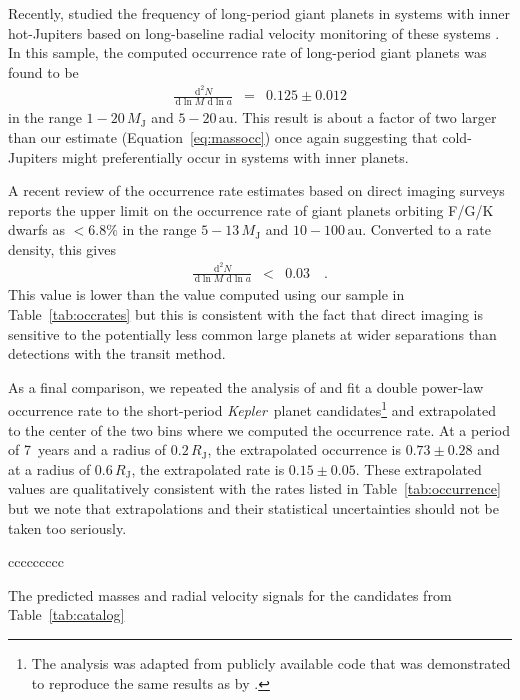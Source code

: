 \documentclass[manuscript, letterpaper]{aastex6}
\newcommand{\project}[1]{\textsl{#1}}
\newcommand{\kepler}{\project{Kepler}}
\renewcommand{\eqref}[1]{\ref{eq:#1}}
\newcommand{\eqalt}[1]{Equation~\eqref{#1}}
\newcommand{\dd}{\ensuremath{\,\mathrm{d}}}
\newcommand{\unit}[1]{{\ensuremath{\,\mathrm{#1}}}}
\begin{document}
Recently, \citet{Bryan:2016} studied the frequency of long-period giant
planets in systems with inner hot-Jupiters based on long-baseline radial
velocity monitoring of these systems \citep{Knutson:2014}.
In this sample, the computed occurrence rate of long-period giant planets was
found to be
\begin{eqnarray}
\frac{\dd^2 N}{\dd\ln M\,\dd\ln a} &=& 0.125 \pm 0.012
\end{eqnarray}
in the range $1-20\,M_\mathrm{J}$ and $5-20\unit{au}$.
This result is about a factor of two larger than our estimate
(\eqalt{massocc}) once again suggesting that cold-Jupiters might
preferentially occur in systems with inner planets.

A recent review of the occurrence rate estimates based on direct imaging
surveys \citep{Bowler:2016} reports the upper limit on the occurrence rate of
giant planets orbiting F/G/K dwarfs as $<6.8\%$ in the range
$5-13\,M_\mathrm{J}$ and $10-100\unit{au}$.
Converted to a rate density, this gives
\begin{eqnarray}
\frac{\dd^2 N}{\dd\ln M\,\dd\ln a} &<& 0.03 \quad.
\end{eqnarray} This value is lower than the value computed using our sample in
Table~\ref{tab:occrates} but this is consistent with the fact that direct
imaging is sensitive to the potentially less common large planets at wider
separations than detections with the transit method.

As a final comparison, we repeated the analysis of \citet{Burke:2015} and fit
a double power-law occurrence rate to the short-period \kepler\ planet
candidates\footnote{The analysis was adapted from publicly available code that
was demonstrated to reproduce the same results as \citet{Burke:2015} by
\citet{Foreman-Mackey:2015a}.} and extrapolated to the center of the two bins
where we computed the occurrence rate.
At a period of 7~years and a radius of $0.2\,R_\mathrm{J}$, the extrapolated
occurrence is $0.73\pm0.28$ and at a radius of $0.6\,R_\mathrm{J}$, the
extrapolated rate is $0.15\pm0.05$.
These extrapolated values are qualitatively consistent with the rates listed
in Table~\ref{tab:occurrence} but we note that extrapolations and their
statistical uncertainties should not be taken too seriously.


\begin{floattable}
\begin{deluxetable}{ccccccccc}
\tabletypesize{\footnotesize}
\caption{The predicted masses and radial velocity signals for the candidates
from Table~\ref{tab:catalog} \label{tab:masses}}

\end{deluxetable}
\end{floattable}
\end{document}
